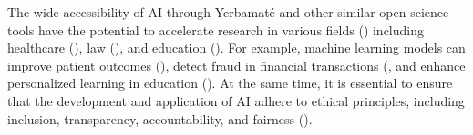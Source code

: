 The wide accessibility of AI through Yerbamaté and other similar open science tools have the potential to accelerate research in various fields (\cite{olson2018system, wolf2020designing,morris2020ai,ong2021guide, li2018can}) including healthcare (\cite{haristiani2020combining}), law (\cite{ashley2017legal}), and education (\cite{goel2020ai}). For example, machine learning models can improve patient outcomes (\cite{hamet2017medicine}), detect fraud in financial transactions (\cite{bao2022fraudartificial}, and enhance personalized learning in education (\cite{haristiani2020combining, goel2020ai}). At the same time, it is essential to ensure that the development and application of AI adhere to ethical principles, including inclusion, transparency, accountability, and fairness (\cite{ accountabilityInAi,  jobin2019global, floridi2018ai4people, wachter2017transparent, arrieta2020explainable, mittelstadt2019principles, goodman2017european, mittelstadt2016ethics, floridi2019establishing, o2017weapons}).

